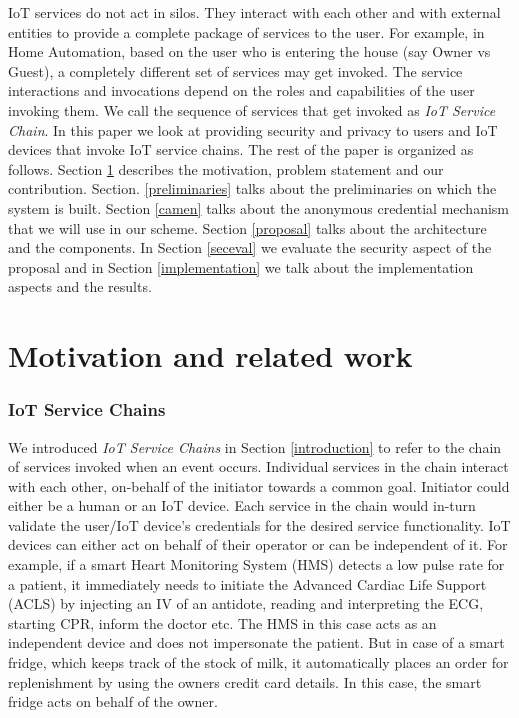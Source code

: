 \documentclass[journal]{IEEEtran}
\begin{document}
IoT services do not act in silos. They interact with each other and with external entities to provide a complete package of services to the user. For example, in Home Automation, based on the user who is entering the house (say Owner vs Guest), a completely different set of services may get invoked. The service interactions and invocations depend on the roles and capabilities of the user invoking them. We call the sequence of services that get invoked as \textit{IoT Service Chain}. In this paper we look at providing security and privacy to users and IoT devices that invoke IoT service chains. The rest of the paper is organized as follows. Section \ref{motivation} describes the motivation, problem statement and our contribution. Section. \ref{preliminaries} talks about the preliminaries on which the system is built. Section \ref{camen} talks about the anonymous credential mechanism that we will use in our scheme. Section \ref{proposal} talks about the architecture and the components. In Section \ref{seceval} we evaluate the security aspect of the proposal and in Section \ref{implementation} we talk about the implementation aspects and the results.

\section{Motivation and related work} \label{motivation}

\subsubsection{IoT Service Chains} \label{iotsvcch}
We introduced \textit{IoT Service Chains} in Section \ref{introduction} to refer to the chain of services invoked when an event occurs. Individual services in the chain interact with each other, on-behalf of the initiator towards a common goal. Initiator could either be a human or an IoT device. Each service in the chain would in-turn validate the user/IoT device's credentials for the desired service functionality. IoT devices can either act on behalf of their operator or can be independent of it. For example, if a smart Heart Monitoring System (HMS) detects a low pulse rate for a patient, it immediately needs to initiate the Advanced Cardiac Life Support (ACLS) by injecting an IV of an antidote, reading and interpreting the ECG, starting CPR, inform the doctor etc. The HMS in this case acts as an independent device and does not impersonate the patient. But in case of a smart fridge, which keeps track of the stock of milk, it automatically places an order for replenishment by using the owners credit card details. In this case, the smart fridge acts on behalf of the owner.
\end{document}
